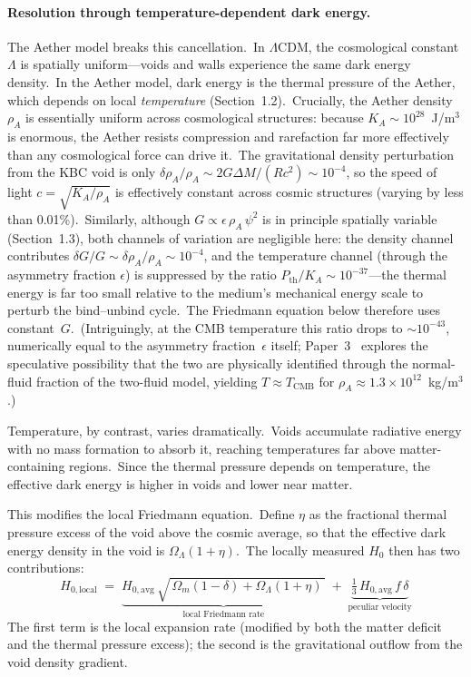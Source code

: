 ﻿\documentclass[12pt,letterpaper]{article}
\newcommand{\rhoa}{\rho_{\!A}}
\newcommand{\Ka}{K_{\!A}}
\begin{document}
\paragraph{Resolution through temperature-dependent dark energy.}
The Aether model breaks this cancellation.\ In $\Lambda$CDM, the cosmological
constant $\Lambda$ is spatially uniform---voids and walls experience the same
dark energy density.\ In the Aether model, dark energy is the thermal pressure
of the Aether, which depends on local \emph{temperature} (Section~1.2).\
Crucially, the Aether density $\rhoa$ is essentially uniform across cosmological
structures: because $\Ka \sim 10^{28}$~J/m$^3$ is enormous, the Aether resists
compression and rarefaction far more effectively than any cosmological force can
drive it.\ The gravitational density perturbation from the KBC void is only
$\delta\rhoa/\rhoa \sim 2G\Delta M/(Rc^2) \sim 10^{-4}$, so the speed of
light $c = \sqrt{\Ka/\rhoa}$ is effectively constant across cosmic structures
(varying by less than 0.01\%).\ Similarly, although $G \propto \epsilon\,\rhoa\,\psi^2$ is in
principle spatially variable (Section~1.3), both channels of variation are
negligible here: the density channel contributes $\delta G/G \sim
\delta\rhoa/\rhoa \sim 10^{-4}$, and the temperature channel (through the
asymmetry fraction $\epsilon$) is suppressed by the ratio
$P_{\mathrm{th}}/\Ka \sim 10^{-37}$---the thermal energy is far too small
relative to the medium's mechanical energy scale to perturb the bind--unbind
cycle.\ The Friedmann equation below therefore uses constant~$G$.\
(Intriguingly, at the CMB temperature this ratio drops to $\sim\!10^{-43}$,
numerically equal to the asymmetry fraction~$\epsilon$ itself;
Paper~3~\cite{otto-gravity} explores the speculative possibility that the two
are physically identified through the normal-fluid fraction of the two-fluid
model, yielding $T \approx T_{\mathrm{CMB}}$ for
$\rhoa \approx 1.3 \times 10^{12}$~kg/m$^3$.)

Temperature, by contrast, varies dramatically.\ Voids accumulate radiative
energy with no mass formation to absorb it, reaching temperatures far above
matter-containing regions.\ Since the thermal pressure depends on temperature,
the effective dark energy is higher in voids and lower near matter.

This modifies the local Friedmann equation.\ Define $\eta$ as the fractional
thermal pressure excess of the void above the cosmic average, so that the
effective dark energy density in the void is $\Omega_\Lambda(1 + \eta)$.\ The
locally measured $H_0$ then has two contributions:
%
\begin{equation}
  H_{0,\mathrm{local}} \;=\; \underbrace{H_{0,\mathrm{avg}}\,
    \sqrt{\,\Omega_m(1 - \delta) + \Omega_\Lambda(1 + \eta)\,}}_{\text{local
    Friedmann rate}} \;+\;
    \underbrace{\tfrac{1}{3}\,H_{0,\mathrm{avg}}\,f\,\delta}_{\text{peculiar
    velocity}}
  \label{eq:H0-local}
\end{equation}
%
The first term is the local expansion rate (modified by both the matter
deficit and the thermal pressure excess); the second is the gravitational
outflow from the void density gradient.
\end{document}
